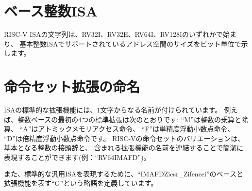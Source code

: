 \begin{comment}
\section{Base Integer ISA}
\end{comment}
\section{ベース整数ISA}

\begin{comment}
RISC-V ISA strings begin with either RV32I, RV32E, RV64I, or RV128I
indicating the supported address space size in bits for the base
integer ISA.
\end{comment}
RISC-V ISAの文字列は、RV32I、RV32E、RV64I、RV128Iのいずれかで始まり、
基本整数ISAでサポートされているアドレス空間のサイズをビット単位で示します。

\begin{comment}
\section{Instruction-Set Extension Names}
\end{comment}
\section{命令セット拡張の命名}

\begin{comment}
Standard ISA extensions are given a name consisting of a single
letter.  For example, the first four standard
extensions to the integer bases are:
``M'' for integer multiplication and division,
``A'' for atomic memory instructions,
``F'' for single-precision floating-point instructions, and
``D'' for double-precision floating-point instructions.
Any RISC-V instruction-set variant can be succinctly described by
concatenating the base integer prefix with the names of the included
extensions, e.g., ``RV64IMAFD''.
\end{comment}
ISAの標準的な拡張機能には、1文字からなる名前が付けられています。
例えば、整数ベースの最初の4つの標準拡張は次のとおりです:
``M''は整数の乗算と除算、
``A''はアトミックメモリアクセス命令、
``F''は単精度浮動小数点命令、
``D''は倍精度浮動小数点命令です。
RISC-Vの命令セットのバリエーションは、基本となる整数の接頭辞と、
含まれる拡張機能の名前を連結することで簡潔に表現することができます(例：``RV64IMAFD'')。

\begin{comment}
We have also defined an abbreviation ``G'' to represent the ``IMAFDZicsr\_Zifencei''
base and extensions, as this is intended to represent our standard
general-purpose ISA.
\end{comment}
また、標準的な汎用ISAを表現するために、``IMAFDZicsr\_Zifencei''のベースと拡張機能を表す``G''という略語を定義しています。

